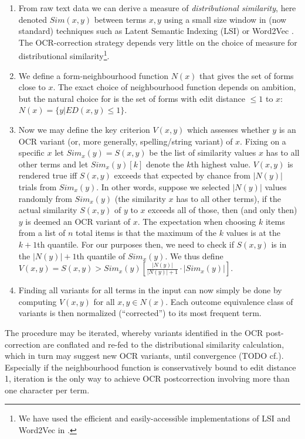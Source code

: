 \documentclass{sig-alternate}
\begin{document}
\begin{enumerate}
\item From raw text data we can derive a measure of
  \emph{distributional similarity}, here denoted $Sim(x,y)$ between
  terms $x,y$ using a small size window in (now standard) techniques
  such as Latent Semantic Indexing (LSI) \cite{cl:Deerwester} or
  Word2Vec \cite{cl:Mikolov:Words-Phrases}. The OCR-correction
  strategy depends very little on the choice of measure for distributional
  similarity\footnote{We have used the efficient and easily-accessible
    implementations of LSI and Word2Vec in \cite{cl:Rehurek:Gensim}.}.

\item We define a form-neighbourhood function $N(x)$ that gives the
  set of forms close to $x$. The exact choice of neighbourhood
  function depends on ambition, but the natural choice for is the set
  of forms with edit distance $\leq 1$ to $x$: $N(x) = \{y|ED(x,y)
  \leq 1\}$.

\item Now we may define the key criterion $V(x,y)$ which assesses
  whether $y$ is an OCR variant (or, more generally, spelling/string
  variant) of $x$. Fixing on a specific $x$ let $Sim_x(y) = S(x, y)$
  be the list of similarity values $x$ has to all other terms and let
  $Sim_x(y)[k]$ denote the $k$th highest value. $V(x,y)$ is rendered
  true iff $S(x,y)$ exceeds that expected by chance from $|N(y)|$
  trials from $Sim_x(y)$. In other words, suppose we selected $|N(y)|$
  values randomly from $Sim_x(y)$ (the similarity $x$ has to all other
  terms), if the actual similarity $S(x, y)$ of $y$ to $x$ exceeds all
  of those, then (and only then) $y$ is deemed an OCR variant of
  $x$. The expectation when choosing $k$ items from a list of $n$
  total items is that the maximum of the $k$ values is at the $k+1$th
  quantile. For our purposes then, we need to check if $S(x, y)$ is in
  the $|N(y)|+1$th quantile of $Sim_x(y)$.  We thus define $V(x,y) =
  S(x, y) > Sim_x(y)[\frac{|N(y)|}{|N(y)|+1} \cdot |Sim_x(y)|]$.

\item Finding all variants for all terms in the input can now simply
  be done by computing $V(x, y)$ for all $x, y \in N(x)$. 
  Each outcome equivalence class of variants is then normalized
  (``corrected'') to its most frequent term.

\end{enumerate}

The procedure may be iterated, whereby variants identified in the OCR
post-correction are conflated and re-fed to the distributional
similarity calculation, which in turn may suggest new OCR variants,
until convergence (TODO cf.). Especially if the neighbourhood function
is conservatively bound to edit distance 1, iteration is the only way
to achieve OCR postcorrection involving more than one character per
term.
\end{document}
